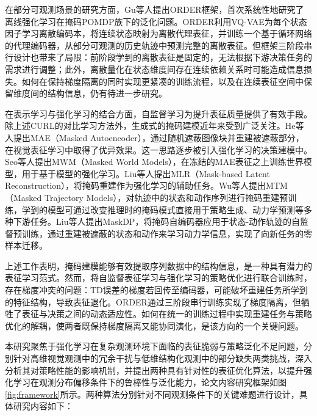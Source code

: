 在部分可观测场景的研究方面，Gu等人\cite{gu2023order}提出ORDER框架，首次系统性地研究了离线强化学习在掩码POMDP族下的泛化问题。ORDER利用VQ-VAE为每个状态因子学习离散编码本，将连续状态映射为离散代理表征，并训练一个基于循环网络的代理编码器，从部分可观测的历史轨迹中预测完整的离散表征。但框架三阶段串行设计也带来了局限：前阶段学到的离散表征是固定的，无法根据下游决策任务的需求进行调整；此外，离散量化在状态维度间存在连续依赖关系时可能造成信息损失。如何在保持梯度隔离的同时实现更紧凑的训练流程，以及在连续表征空间中保留维度间的结构信息，仍有待进一步研究。

在表示学习与强化学习的结合方面，自监督学习为提升表征质量提供了有效手段。除上述CURL的对比学习方法外，生成式的掩码建模近年来受到广泛关注。He等人提出MAE\cite{he2022masked}（Masked Autoencoder），通过随机遮蔽图像块并重建被遮蔽部分，在视觉表征学习中取得了优异效果。这一思路逐步被引入强化学习的决策建模中。Seo等人提出MWM\cite{seo2022masked}（Masked World Models），在冻结的MAE表征之上训练世界模型，用于基于模型的强化学习。Liu等人提出MLR\cite{liu2022mask}（Mask-based Latent Reconstruction），将掩码重建作为强化学习的辅助任务。Wu等人提出MTM\cite{wu2023masked}（Masked Trajectory Models），对轨迹中的状态和动作序列进行掩码重建预训练，学到的模型可通过改变推理时的掩码模式直接用于策略生成、动力学预测等多种下游任务。Liu等人提出MaskDP\cite{liu2022maskdp}，将掩码自编码器应用于状态-动作轨迹的自监督预训练，通过重建被遮蔽的状态和动作来学习动力学信息，实现了向新任务的零样本迁移。

上述工作表明，掩码建模能够有效提取序列数据中的结构信息，是一种具有潜力的表征学习范式。然而，将自监督表征学习与强化学习的策略优化进行联合训练时，存在梯度冲突的问题：TD误差的梯度若回传至编码器，可能破坏重建任务所学到的特征结构，导致表征退化。ORDER通过三阶段串行训练实现了梯度隔离，但牺牲了表征与决策之间的动态适应性。如何在统一的训练过程中实现重建任务与策略优化的解耦，使两者既保持梯度隔离又能协同演化，是该方向的一个关键问题。


本研究聚焦于强化学习在复杂观测环境下面临的表征脆弱与策略泛化不足问题，分别针对高维视觉观测中的冗余干扰与低维结构化观测中的部分缺失两类挑战，深入分析其对策略性能的影响机制，并提出两种具有针对性的表征优化算法，以提升强化学习在观测分布偏移条件下的鲁棒性与泛化能力，论文内容研究框架如图\ref{fig:framework}所示。两种算法分别针对不同观测条件下的关键难题进行设计，具体研究内容如下：

